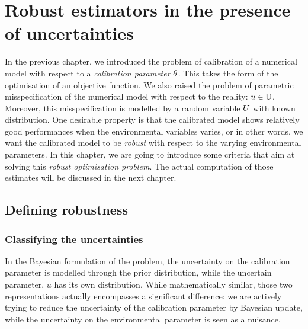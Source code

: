 \documentclass[../../Main_ManuscritThese.tex]{subfiles}
\begin{document}
\chapter{Robust estimators in the presence of uncertainties} 
\label{chap:robust_estimators}

\minitoc
\newpage
\subfileLocal{\pagestyle{contentStyle}}
In the previous chapter, we introduced the problem of calibration of a
numerical model with respect to a \emph{calibration parameter}
$\theta$. This takes the form of the optimisation of an objective
function. We also raised the problem of parametric misspecification of
the numerical model with respect to the reality: $u \in
\mathbb{U}$. Moreover, this misspecification is modelled by a random
variable $U$ with known distribution.  One desirable property is
that the calibrated model shows relatively good performances when the
environmental variables varies, or in other words, we want the
calibrated model to be \emph{robust} with respect to the varying
environmental parameters. In this chapter, we are going to introduce
some criteria that aim at solving this \emph{robust optimisation
  problem}. The actual computation of those estimates will be
discussed in the next chapter.

\section{Defining robustness}
\label{sec:def_robustness}
\subsection{Classifying the uncertainties}
In the Bayesian formulation of the problem, the uncertainty on the
calibration parameter is modelled through the prior distribution,
while the uncertain parameter, $u$ has its own distribution. While
mathematically similar, those two representations actually encompasses
a significant difference: we are actively trying to reduce the
uncertainty of the calibration parameter by Bayesian update, while the
uncertainty on the environmental parameter is seen as a nuisance.
\end{document}
